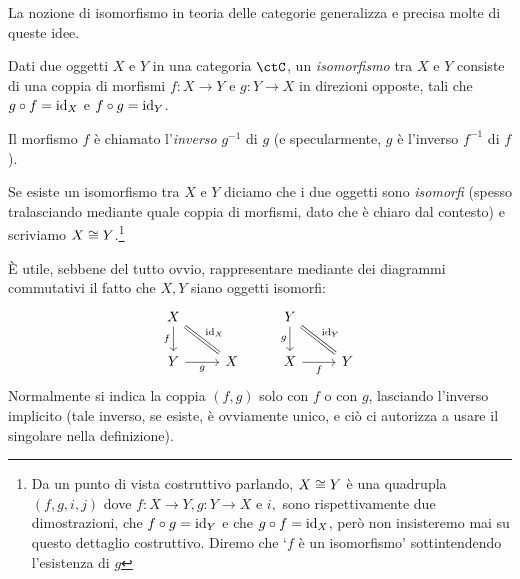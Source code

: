La nozione di isomorfismo in teoria delle categorie generalizza e precisa molte di queste idee.
\begin{definition}[Isomorfismo]\label{def_isomorfismo}
	Dati due oggetti \(X\) e \(Y\) in una categoria \(\ctC\), un \emph{isomorfismo} tra \(X\) e \(Y\) consiste di una coppia di morfismi \(f:X\to Y\) e \(g:Y\to X\) in direzioni opposte, tali che \(g\circ f=\mathrm{id}_X\) e \(f\circ g=\mathrm{id}_Y\).

	Il morfismo \(f\) è chiamato l'\emph{inverso} \(g^{-1}\) di \(g\) (e specularmente, \(g\) è l'inverso \(f^{-1}\) di \(f\)).

	Se esiste un isomorfismo tra \(X\) e \(Y\) diciamo che i due oggetti sono \emph{isomorfi} (spesso tralasciando mediante quale coppia di morfismi, dato che è chiaro dal contesto) e scriviamo \(X\cong Y\).\footnote{Da un punto di vista costruttivo parlando, \(X\cong Y\) è una quadrupla \((f,g, i,j)\) dove \(f : X\to Y, g: Y\to X\) e \(i,\) sono rispettivamente due dimostrazioni, che \(f\circ g= \mathrm{id}_Y\) e che \(g\circ f=\mathrm{id}_X\), però non insisteremo mai su questo dettaglio costruttivo. Diremo che `\(f\) è un isomorfismo' sottintendendo l'esistenza di \(g\)}
\end{definition}
\`E utile, sebbene del tutto ovvio, rappresentare mediante dei diagrammi commutativi il fatto che \(X,Y\) siano oggetti isomorfi: %
\[
	\begin{tikzcd}
		X\ar[d, "f"'] \ar[dr, equal, "\id_X"]& & Y \ar[dr, equal, "\id_Y"]\ar[d,"g"']\\
		Y \ar[r, "g"']& X & X \ar[r, "f"']& Y
	\end{tikzcd}
\]
Normalmente si indica la coppia \((f,g)\) solo con \(f\) o con \(g\), lasciando l'inverso implicito (tale inverso, se esiste, è ovviamente unico, e ciò ci autorizza a usare il singolare nella definizione).

